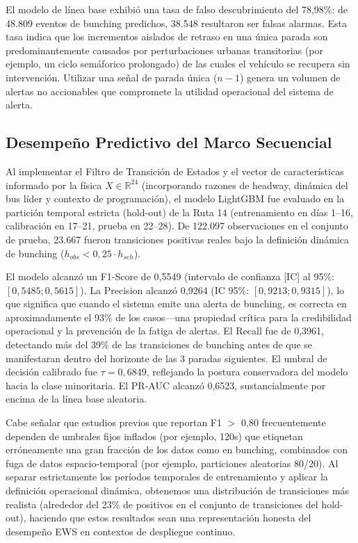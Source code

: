 \documentclass[fleqn,10pt,lineno]{wlpeerj}
\begin{document}
El modelo de l\'inea base exhibi\'o una tasa de falso descubrimiento del 78,98\%: de 48.809 eventos de bunching predichos, 38.548 resultaron ser falsas alarmas. Esta tasa indica que los incrementos aislados de retraso en una \'unica parada son predominantemente causados por perturbaciones urbanas transitorias (por ejemplo, un ciclo sem\'aforico prolongado) de las cuales el veh\'iculo se recupera sin intervenci\'on. Utilizar una se\~nal de parada \'unica ($n{-}1$) genera un volumen de alertas no accionables que compromete la utilidad operacional del sistema de alerta.

\subsection{Desempe\~no Predictivo del Marco Secuencial}

Al implementar el Filtro de Transici\'on de Estados y el vector de caracter\'isticas informado por la f\'isica $X \in \mathbb{R}^{24}$ (incorporando razones de headway, din\'amica del bus l\'ider y contexto de programaci\'on), el modelo LightGBM fue evaluado en la partici\'on temporal estricta (hold-out) de la Ruta 14 (entrenamiento en d\'ias 1--16, calibraci\'on en 17--21, prueba en 22--28). De 122.097 observaciones en el conjunto de prueba, 23.667 fueron transiciones positivas reales bajo la definici\'on din\'amica de bunching ($h_{obs} < 0,25 \cdot h_{sch}$).

El modelo alcanz\'o un F1-Score de 0,5549 (intervalo de confianza [IC] al 95\%: $[0,5485; 0,5615]$). La Precision alcanz\'o 0,9264 (IC 95\%: $[0,9213; 0,9315]$), lo que significa que cuando el sistema emite una alerta de bunching, es correcta en aproximadamente el 93\% de los casos---una propiedad cr\'itica para la credibilidad operacional y la prevenci\'on de la fatiga de alertas. El Recall fue de 0,3961, detectando m\'as del 39\% de las transiciones de bunching antes de que se manifestaran dentro del horizonte de las 3 paradas siguientes. El umbral de decisi\'on calibrado fue $\tau = 0,6849$, reflejando la postura conservadora del modelo hacia la clase minoritaria. El PR-AUC alcanz\'o 0,6523, sustancialmente por encima de la l\'inea base aleatoria.

Cabe se\~nalar que estudios previos que reportan F1 $>$ 0,80 frecuentemente dependen de umbrales fijos inflados (por ejemplo, 120s) que etiquetan err\'oneamente una gran fracci\'on de los datos como en bunching, combinados con fuga de datos espacio-temporal (por ejemplo, particiones aleatorias 80/20). Al separar estrictamente los per\'iodos temporales de entrenamiento y aplicar la definici\'on operacional din\'amica, obtenemos una distribuci\'on de transiciones m\'as realista (alrededor del 23\% de positivos en el conjunto de transiciones del hold-out), haciendo que estos resultados sean una representaci\'on honesta del desempe\~no EWS en contextos de despliegue continuo.
\end{document}
